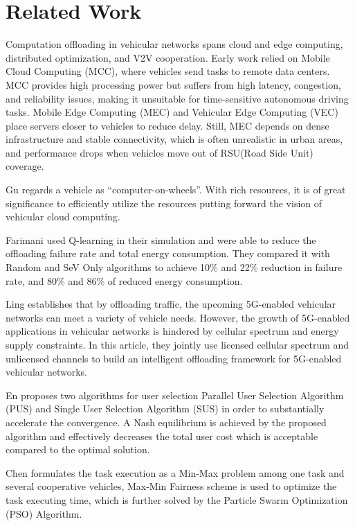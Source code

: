 \documentclass[conference]{IEEEtran}
\begin{document}
\section{Related Work}
Computation offloading in vehicular networks spans cloud and edge computing, distributed optimization, and V2V cooperation. Early work relied on Mobile Cloud Computing (MCC), where vehicles send tasks to remote data centers. MCC provides high processing power but suffers from high latency, congestion, and reliability issues, making it unsuitable for time-sensitive autonomous driving tasks. Mobile Edge Computing (MEC) and Vehicular Edge Computing (VEC) place servers closer to vehicles to reduce delay. Still, MEC depends on dense infrastructure and stable connectivity, which is often unrealistic in urban areas, and performance drops when vehicles move out of RSU(Road Side Unit) coverage.
 
Gu \cite{gu2013vehicular} regards a vehicle as “computer-on-wheels”. With rich resources, it is of great significance to efficiently utilize the resources putting forward the vision of vehicular cloud computing. 

Farimani \cite{farimani2022computation} used Q-learning in their simulation and were able to reduce the offloading failure rate and total energy consumption. They compared it with Random and SeV Only algorithms to achieve 10\% and 22\% reduction in failure rate, and 80\% and 86\% of reduced energy consumption.

Ling \cite{8809673} establishes that by offloading traffic, the upcoming 5G-enabled vehicular networks can meet a variety of vehicle needs. However, the growth of 5G-enabled applications in vehicular networks is hindered by cellular spectrum and energy supply constraints. In this article, they jointly use licensed cellular spectrum and unlicensed channels to build an intelligent offloading framework for 5G-enabled vehicular networks.

En \cite{9637782} proposes two algorithms for user selection Parallel User Selection Algorithm (PUS) and Single User Selection Algorithm (SUS) in order to substantially accelerate the convergence.
A Nash equilibrium is achieved by the proposed algorithm and effectively decreases the total user cost which is acceptable compared to the optimal solution.

Chen \cite{8964584} formulates the task execution as a Min-Max problem among one task and several cooperative vehicles,  Max-Min Fairness scheme is used to optimize the task executing time, which is further solved by the Particle Swarm Optimization (PSO) Algorithm.
\end{document}
